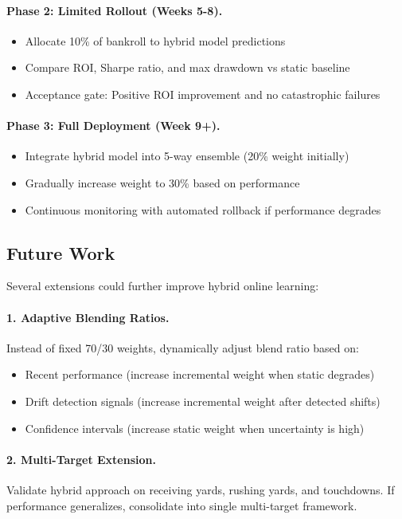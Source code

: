 \paragraph{Phase 2: Limited Rollout (Weeks 5-8).}
\begin{itemize}
\item Allocate 10\% of bankroll to hybrid model predictions
\item Compare ROI, Sharpe ratio, and max drawdown vs static baseline
\item Acceptance gate: Positive ROI improvement and no catastrophic failures
\end{itemize}

\paragraph{Phase 3: Full Deployment (Week 9+).}
\begin{itemize}
\item Integrate hybrid model into 5-way ensemble (20\% weight initially)
\item Gradually increase weight to 30\% based on performance
\item Continuous monitoring with automated rollback if performance degrades
\end{itemize}

\subsection{Future Work}

Several extensions could further improve hybrid online learning:

\paragraph{1. Adaptive Blending Ratios.} Instead of fixed 70/30 weights, dynamically adjust blend ratio based on:
\begin{itemize}
\item Recent performance (increase incremental weight when static degrades)
\item Drift detection signals (increase incremental weight after detected shifts)
\item Confidence intervals (increase static weight when uncertainty is high)
\end{itemize}

\paragraph{2. Multi-Target Extension.} Validate hybrid approach on receiving yards, rushing yards, and touchdowns. If performance generalizes, consolidate into single multi-target framework.

